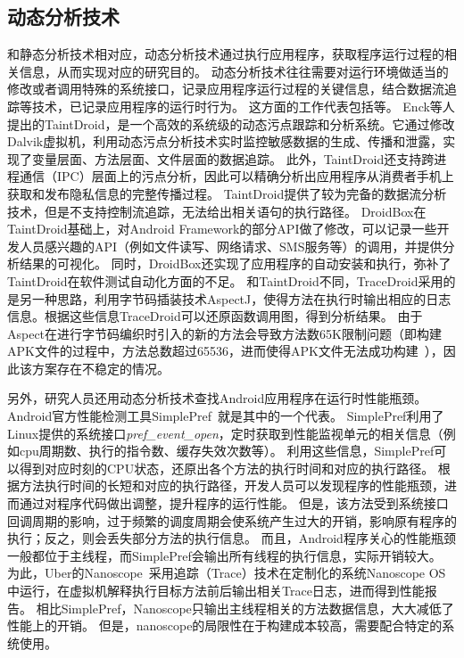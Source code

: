 \subsection{动态分析技术}
和静态分析技术相对应，动态分析技术通过执行应用程序，获取程序运行过程的相关信息，从而实现对应的研究目的。
动态分析技术往往需要对运行环境做适当的修改或者调用特殊的系统接口，记录应用程序运行过程的关键信息，结合数据流追踪等技术，已记录应用程序的运行时行为。
这方面的工作代表包括\cite{chun2014taintdroid,droidbox:online,van2013dynamic,droidscope}等。
Enck等人提出的TaintDroid\cite{chun2014taintdroid}，是一个高效的系统级的动态污点跟踪和分析系统。它通过修改Dalvik虚拟机，利用动态污点分析技术实时监控敏感数据的生成、传播和泄露，实现了变量层面、方法层面、文件层面的数据追踪。
此外，TaintDroid还支持跨进程通信（IPC）层面上的污点分析，因此可以精确分析出应用程序从消费者手机上获取和发布隐私信息的完整传播过程。
TaintDroid提供了较为完备的数据流分析技术，但是不支持控制流追踪，无法给出相关语句的执行路径。
DroidBox\cite{droidbox:online}在TaintDroid基础上，对Android Framework的部分API做了修改，可以记录一些开发人员感兴趣的API（例如文件读写、网络请求、SMS服务等）的调用，并提供分析结果的可视化。
同时，DroidBox还实现了应用程序的自动安装和执行，弥补了TaintDroid在软件测试自动化方面的不足。
和TaintDroid不同，TraceDroid\cite{van2013dynamic}采用的是另一种思路，利用字节码插装技术AspectJ，使得方法在执行时输出相应的日志信息。根据这些信息TraceDroid可以还原函数调用图，得到分析结果。
由于Aspect在进行字节码编织时引入的新的方法会导致方法数65K限制问题（即构建APK文件的过程中，方法总数超过65536，进而使得APK文件无法成功构建~\cite{Configur27}），因此该方案存在不稳定的情况。


另外，研究人员还用动态分析技术查找Android应用程序在运行时性能瓶颈。Android官方性能检测工具SimplePref~\cite{simpleperf:online}就是其中的一个代表。
SimplePref利用了Linux提供的系统接口\textit{pref\_event\_open}，定时获取到性能监视单元的相关信息（例如cpu周期数、执行的指令数、缓存失效次数等）。
利用这些信息，SimplePref可以得到对应时刻的CPU状态，还原出各个方法的执行时间和对应的执行路径。
根据方法执行时间的长短和对应的执行路径，开发人员可以发现程序的性能瓶颈，进而通过对程序代码做出调整，提升程序的运行性能。
但是，该方法受到系统接口回调周期的影响，过于频繁的调度周期会使系统产生过大的开销，影响原有程序的执行；反之，则会丢失部分方法的执行信息。
而且，Android程序关心的性能瓶颈一般都位于主线程，而SimplePref会输出所有线程的执行信息，实际开销较大。
为此，Uber的Nanoscope~\cite{ubernanoscope:online}采用追踪（Trace）技术在定制化的系统Nanoscope OS中运行，在虚拟机解释执行目标方法前后输出相关Trace日志，进而得到性能报告。
相比SimplePref，Nanoscope只输出主线程相关的方法数据信息，大大减低了性能上的开销。
但是，nanoscope的局限性在于构建成本较高，需要配合特定的系统使用。




